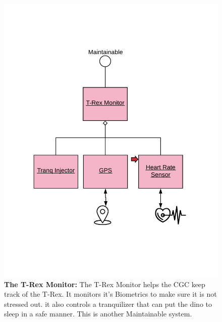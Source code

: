 \documentclass[12pt]{article}
\begin{document}
\begin{figure}[H]
    \centerline{\includegraphics[scale=.20]{TRexMonitor.png}}
    \caption{\textbf{The T-Rex Monitor: }The T-Rex Monitor  helps the CGC keep track of the T-Rex. 
It monitors it's Biometrics to make sure it is not stressed out. it also controls a tranquilizer 
that can put the dino to sleep in a safe manner. This is another Maintainable system. }
    \label{fig:TRexMonitor}
\end{figure}
\end{document}
